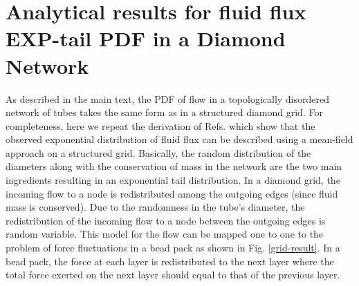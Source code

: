 \documentclass[%
 amsmath,amssymb,
prstper,
]{revtex4-2}
\begin{document}
%
%

\section{Analytical results for fluid flux EXP-tail PDF in a Diamond Network}
%
\label{sec:analytical}
%
As described in the main text, the PDF of flow in a topologically disordered network of tubes takes the same form  as in a  structured diamond grid. For completeness, here we repeat the derivation of Refs. \cite{liu1995force,coppersmith1996model,alim2017local} which  show that the observed exponential distribution of fluid flux can be described using a mean-field approach on a structured grid. Basically, the random distribution of the diameters along with the conservation of mass in the network are the two main ingredients resulting in an exponential tail distribution. In a diamond grid, the incoming flow to a node is redistributed among the outgoing edges (since fluid mass is conserved). Due to the randomness in the tube's diameter, the redistribution of the incoming flow to a node between the outgoing edges is random variable.  This model for the flow can be mapped one to one to the problem of force fluctuations in a bead pack \cite{liu1995force,coppersmith1996model,alim2017local} as shown in Fig. \ref{grid-result}. In a bead pack, the force at each layer is redistributed to the next layer where the total force exerted on the next layer should equal to that of the previous layer. 
%
\end{document}
